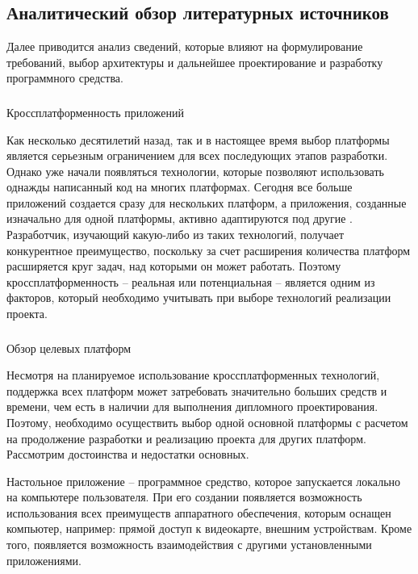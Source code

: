 \subsection{Аналитический обзор литературных источников}
\label{sec:analysis:literature}

Далее приводится анализ сведений, которые влияют на формулирование требований, выбор архитектуры и дальнейшее 
проектирование и разработку программного средства.

\subsubsection{} Кроссплатформенность приложений
\label{sec:analysis:literature:crossplatform}

Как несколько десятилетий назад, так и в настоящее время выбор платформы является серьезным ограничением для всех
последующих этапов разработки. Однако уже начали появляться технологии, которые позволяют использовать однажды
написанный код на многих платформах. Сегодня все больше приложений создается сразу для нескольких платформ, а
приложения, созданные изначально для одной платформы, активно адаптируются под другие \cite{habr_crossplatform}.
Разработчик, изучающий какую-либо из таких технологий, получает конкурентное преимущество, поскольку за счет расширения
количества платформ расширяется круг задач, над которыми он может работать. Поэтому кроссплатформенность – реальная или
потенциальная – является одним из факторов, который необходимо учитывать при выборе технологий реализации проекта.

\subsubsection{} Обзор целевых платформ
\label{sec:analysis:literature:platforms}

Несмотря на планируемое использование кроссплатформенных технологий, поддержка всех платформ может затребовать
значительно больших средств и времени, чем есть в наличии для выполнения дипломного проектирования. Поэтому, необходимо
осуществить выбор одной основной платформы с расчетом на продолжение разработки и реализацию проекта для других платформ.
Рассмотрим достоинства и недостатки основных.

Настольное приложение -- программное средство, которое запускается локально на компьютере пользователя. При его
создании появляется возможность использования всех преимуществ аппаратного обеспечения, которым оснащен компьютер,
например: прямой доступ к видеокарте, внешним устройствам. Кроме того, появляется возможность взаимодействия с другими
установленными приложениями.

